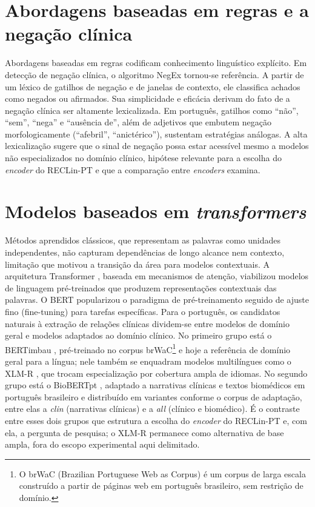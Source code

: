 \section{Abordagens baseadas em regras e a negação clínica}

Abordagens baseadas em regras codificam conhecimento linguístico explícito. Em
detecção de negação clínica, o algoritmo NegEx \cite{chapman_2001_negex}
tornou-se referência. A partir de um léxico de gatilhos de negação e de janelas
de contexto, ele classifica achados como negados ou afirmados. Sua simplicidade e
eficácia derivam do fato de a negação clínica ser altamente lexicalizada. Em
português, gatilhos como ``não'', ``sem'', ``nega'' e ``ausência de'', além de
adjetivos que embutem negação morfologicamente (``afebril'', ``anictérico''),
sustentam estratégias análogas. A alta lexicalização sugere que o sinal de
negação possa estar acessível mesmo a modelos não especializados no domínio
clínico, hipótese relevante para a escolha do \emph{encoder} do RECLin-PT e que a
comparação entre \emph{encoders} examina.

\section{Modelos baseados em \emph{transformers}}

Métodos aprendidos clássicos, que representam as palavras como unidades
independentes, não capturam dependências de longo alcance nem contexto, limitação
que motivou a transição da área para modelos contextuais. A arquitetura
\foreignlanguage{english}{Transformer} \cite{vaswani_2017_attention},
baseada em mecanismos de atenção, viabilizou modelos de linguagem pré-treinados
que produzem representações contextuais das palavras. O BERT
\cite{devlin_2019_bert} popularizou o paradigma de pré-treinamento seguido de
ajuste fino (\foreignlanguage{english}{fine-tuning}) para tarefas específicas.
Para o português, os candidatos naturais à extração de relações clínicas dividem-se
entre modelos de domínio geral e modelos adaptados ao domínio
clínico. No primeiro grupo está o BERTimbau \cite{souza_2020_bertimbau},
pré-treinado no corpus brWaC\footnote{O brWaC
(\foreignlanguage{english}{Brazilian Portuguese Web as Corpus}) é um corpus de
larga escala construído a partir de páginas web em português brasileiro, sem
restrição de domínio.} e hoje a referência de domínio geral para a língua;
nele também se enquadram modelos multilíngues como o XLM-R
\cite{conneau_2020_xlmr}, que trocam especialização por cobertura ampla de idiomas.
No segundo grupo está o BioBERTpt \cite{schneider_2020_biobertpt},
adaptado a narrativas clínicas e textos biomédicos em português brasileiro e
distribuído em variantes conforme o corpus de adaptação, entre elas a
\emph{clin} (narrativas clínicas) e a \emph{all} (clínico e biomédico). É o
contraste entre esses dois grupos que estrutura a escolha do \emph{encoder} do
RECLin-PT e, com ela, a pergunta de pesquisa; o
XLM-R permanece como alternativa de base ampla, fora do escopo experimental aqui
delimitado.

